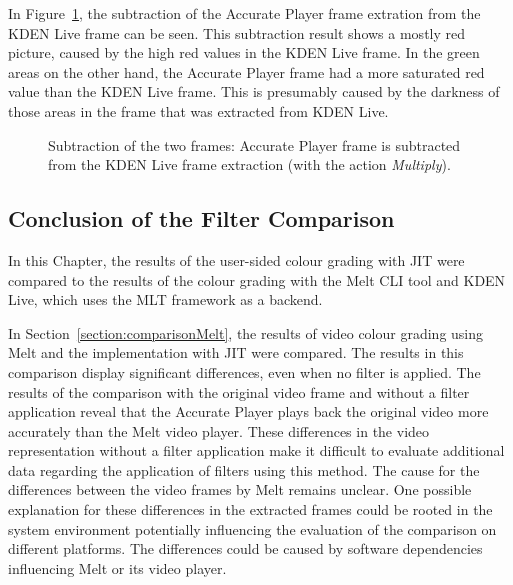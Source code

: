 \documentclass[../MasterThesis.tex]{subfiles}
\begin{document}
In Figure~\ref{figure:multiplygimp}, the subtraction of the Accurate Player frame extration from the KDEN Live frame can be seen. This subtraction result shows a mostly red picture, caused by the high red values in the KDEN Live frame. In the green areas on the other hand, the Accurate Player frame had a more saturated red value than the KDEN Live frame. This is presumably caused by the darkness of those areas in the frame that was extracted from KDEN Live.



\begin{figure}[H]
	\begin{center}
		\caption[Subtraction of KDEN Live (\textit{Multiply} and Accurate Player).]{Subtraction of the two frames: Accurate Player frame is subtracted from the KDEN Live frame extraction (with the action \textit{Multiply}).}
		\label{figure:multiplygimp}
	\end{center}
\end{figure}














\subsection{Conclusion of the Filter Comparison} \label{section:resultscomparisons}


In this Chapter, the results of the user-sided colour grading with JIT were compared to the results of the colour grading with the Melt CLI tool and KDEN Live, which uses the MLT framework as a backend.

In Section~\ref{section:comparisonMelt}, the results of video colour grading using Melt and the implementation with JIT were compared. 
The results in this comparison display significant differences, even when no filter is applied. 
The results of the comparison with the original video frame and without a filter application reveal that the Accurate Player plays back the original video more accurately than the Melt video player.
These differences in the video representation without a filter application make it difficult to evaluate additional data regarding the application of filters using this method. The cause for the differences between the video frames by Melt remains unclear.
One possible explanation for these differences in the extracted frames could be rooted in the system environment potentially influencing the evaluation of the comparison on different platforms. The differences could be caused by software dependencies influencing Melt or its video player.
\end{document}
